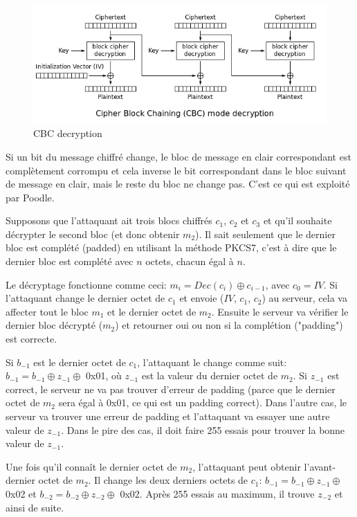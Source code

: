 \begin{figure}[H]
\centering
\includegraphics[scale=0.6]{img/cbc-dec.png}
\caption{CBC decryption}
\label{cbc-dec}
\end{figure}

Si un bit du message chiffré change, le bloc de message en clair correspondant est complètement corrompu et cela inverse le bit correspondant dans le bloc suivant de message en clair, mais le reste du bloc ne change pas. C'est ce qui est exploité par Poodle.

Supposons que l'attaquant ait trois blocs chiffrés $c_1$, $c_2$ et $c_3$ et qu'il souhaite décrypter le second bloc (et donc obtenir $m_2$). Il sait seulement que le dernier bloc est complété (padded) en utilisant la méthode PKCS7, c'est à dire que le dernier bloc est complété avec $n$ octets, chacun égal à $n$.

Le décryptage fonctionne comme ceci: $m_i = Dec(c_i) \oplus c_{i-1}$, avec $c_0 = IV$. Si l'attaquant change le dernier octet de $c_1$ et envoie ($IV$, $c_1$, $c_2$) au serveur, cela va affecter tout le bloc $m_1$ et le dernier octet de $m_2$. Ensuite le serveur va vérifier le dernier bloc décrypté ($m_2$) et retourner oui ou non si la complétion ("padding") est correcte.

Si $b_{-1}$ est le dernier octet de $c_1$, l'attaquant le change comme suit: $b_{-1} = b_{-1} \oplus z_{-1} \oplus$ 0x01, où $z_{-1}$ est la valeur du dernier octet de $m_2$. Si $z_{-1}$ est correct, le serveur ne va pas trouver d'erreur de padding (parce que le dernier octet de $m_2$ sera égal à 0x01, ce qui est un padding correct). Dans l'autre cas, le serveur va trouver une erreur de padding et l'attaquant va essayer une autre valeur de $z_{-1}$. Dans le pire des cas, il doit faire 255 essais pour trouver la bonne valeur de $z_{-1}$.

Une fois qu'il conna\^it le dernier octet de $m_2$, l'attaquant peut obtenir l'avant-dernier octet de $m_2$. Il change les deux derniers octets de $c_1$: $b_{-1} = b_{-1} \oplus z_{-1} \oplus$ 0x02 et $b_{-2} = b_{-2} \oplus z_{-2} \oplus$ 0x02. Après 255 essais au maximum, il trouve $z_{-2}$ et ainsi de suite. 

